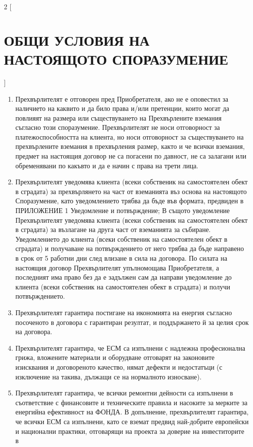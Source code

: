 \begin{multicols}{2} [\section{ОБЩИ УСЛОВИЯ НА НАСТОЯЩОТО
    СПОРАЗУМЕНИЕ}]
  \begin{enumerate}
  \item Прехвърлителят е отговорен пред Приобретателя, ако не е
    оповестил за наличието на каквито и да било права и/или претенции,
    които могат да повлияят на размера или съществуването на
    Прехвърлените вземания съгласно този споразумение. Прехвърлителят
    не носи отговорност за платежоспособността на клиента, но носи
    отговорност за съществуването на прехвърлените вземания в
    прехвърления размер, както и че всички вземания, предмет на
    настоящия договор не са погасени по давност, не са залагани или
    обременявани по какъвто и да е начин с права на трети лица.
  \item Прехвърлителят уведомява клиента (всеки собственик на
    самостоятелен обект в сградата) за прехвърлянето на част от
    вземанията въз основа на настоящото Споразумение, като
    уведомлението трябва да бъде във формата, предвиден в ПРИЛОЖЕНИЕ 1
    Уведомление и потвърждение; В същото уведомление Прехвърлителят
    уведомява клиента (всеки собственик на самостоятелен обект в
    сградата) за възлагане на друга част от вземанията за
    събиране. Уведомлението до клиента (всеки собственик на
    самостоятелен обект в сградата) и получаване на потвърждението от
    него трябва да бъде направено в срок от 5 работни дни след влизане
    в сила на договора. По силата на настоящия договор Прехвърлителят
    упълномощава Приобретателя, а последният има право без да е
    задължен сам да направи уведомление до клиента (всеки собственик
    на самостоятелен обект в сградата) и получи потвърждението.
  \item Прехвърлителят гарантира постигане на икономията на енергия
    съгласно посоченото в договора с гарантиран резултат, и
    поддържането й за целия срок на договора.
  \item Прехвърлителят гарантира, че ЕСМ са изпълнени с надлежна
    професионална грижа, вложените материали и оборудване отговарят на
    законовите изисквания и договореното качество, нямат дефекти и
    недостатъци (с изключение на такива, дължащи се на нормалното
    износване).
  \item Прехвърлителят гарантира, че всички ремонтни дейности са
    изпълнени в съответствие с финансовите и техническите правила и
    насоките за мерките за енергийна ефективност на ФОНДА. В
    допълнение, прехвърлителят гарантира, че всички ЕСМ са изпълнени,
    като се вземат предвид най-добрите европейски и национални
    практики, отговарящи на проекта за доверие на инвеститорите в

\end{enumerate}
\end{multicols}
